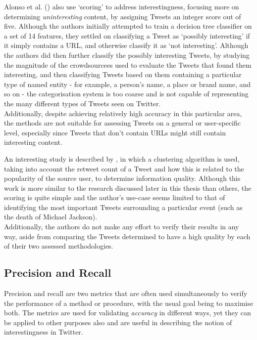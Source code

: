 Alonso et al. (\cite{alonso10}) also use `scoring' to address interestingness, focusing more on determining \textit{uninteresting} content, by assigning Tweets an integer score out of five. Although the authors initially attempted to train a decision tree classifier on a set of 14 features, they settled on classifying a Tweet as `possibly interesting' if it simply contains a URL, and otherwise classify it as `not interesting'. Although the authors did then further classify the possibly interesting Tweets, by studying the magnitude of the crowdsourcees used to evaluate the Tweets that found them interesting, and then classifying Tweets based on them containing a particular type of named entity - for example, a person's name, a place or brand name, and so on - the categorisation system is too coarse and is not capable of representing the many different types of Tweets seen on Twitter.\\
Additionally, despite achieving relatively high accuracy in this particular area, the methods are not suitable for assessing Tweets on a general or user-specific level, especially since Tweets that don't contain URLs might still contain interesting content.

An interesting study is described by \cite{lauw10}, in which a clustering algorithm is used, taking into account the retweet count of a Tweet and how this is related to the popularity of the source user, to determine information quality. Although this work is more similar to the research discussed later in this thesis than others, the scoring is quite simple and the author's use-case seems limited to that of identifying the most important Tweets surrounding a particular event (such as the death of Michael Jackson).\\
Additionally, the authors do not make any effort to verify their results in any way, aside from comparing the Tweets determined to have a high quality by each of their two assessed methodologies.


\subsection{Precision and Recall}
Precision and recall are two metrics that are often used simultaneously to verify the performance of a method or procedure, with the usual goal being to maximise both. The metrics are used for validating \textit{accuracy} in different ways, yet they can be applied to other purposes also and are useful in describing the notion of interestingness in Twitter.

